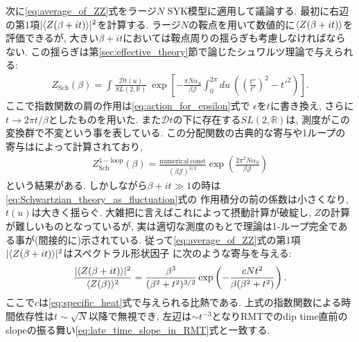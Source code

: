 次に\eqref{eq:average_of_ZZ}式をラージ$N$ SYK模型に適用して議論する. 
最初に右辺の第1項$|\langle Z(\beta + it) \rangle|^2$を計算する. 
ラージ$N$の鞍点を用いて数値的に$\langle Z(\beta + it) \rangle$を評価できるが, 
大きい$\beta + it$においては鞍点周りの揺らぎも考慮しなければならない. 
この揺らぎは第\ref{sec:effective_theory}節で論じたシュワルツ理論で与えられる:
\begin{align}
	Z_{\mathrm{Sch}}(\beta)
	= \int \frac{\mathcal{D}t(u)}{SL(2, \mathbb{R})}\ 
		\exp\left[
			-\frac{\pi N\alpha_S}{\beta\mathcal{J}}\int_0^{2\pi}du\ 
			\left(\left(\frac{t''}{t'}\right)^2 - t'^2\right)		
		\right].
	\label{eq:Schwartzian_theory_as_fluctuation}
\end{align}
ここで指数関数の肩の作用は\eqref{eq:action_for_epsilon}式で
$\epsilon$を$t$に書き換え, さらに$t\to 2\pi t/\beta$としたものを用いた. 
また$\mathcal{D}t$の下に存在する$SL(2,\mathbb{R})$は, 測度がこの変換群で不変という事を表している. 
この分配関数の古典的な寄与や1ループの寄与は\cite{maldacena}によって計算されており, 
\begin{align}
	Z_{\mathrm{Sch}}^{\mathrm{1-loop}}(\beta)
	= \frac{\mathrm{numerical\ const}}{(\beta \mathcal{J})^{3/2}}
		\exp\left(\frac{2\pi^2N\alpha_S}{\beta\mathcal{J}}\right)
	\label{eq:one_loop_Schwartzian}
\end{align}
という結果がある. 
しかしながら$\beta + it\gg 1$の時は\eqref{eq:Schwartzian_theory_as_fluctuation}式の
作用積分の前の係数は小さくなり, $t(u)$は大きく揺らぐ. 
大雑把に言えばこれによって摂動計算が破綻し, $Z$の計算が難しいものとなっているが, 
実は適切な測度のもとで理論は1-ループ完全である事が(間接的に)示されている\cite{polchinski_chaos}. 
従って\eqref{eq:average_of_ZZ}式の第1項$|\langle Z(\beta + it) \rangle|^2$はスペクトラル形状因子
に次のような寄与を与える:
\begin{align}
	\frac{|\langle Z(\beta + it) \rangle|^2}{\langle Z(\beta) \rangle^2}
	= \frac{\beta^3}{(\beta^2 + t^2)^{3/2}}\exp\left(
		-\frac{cNt^2}{\beta(\beta^2 + t^2)}	
	\right).
	\label{eq:slope_in_SYK}
\end{align}
ここで$c$は\eqref{eq:specific_heat}式で与えられる比熱である. 
上式の指数関数による時間依存性は$t\sim \sqrt{N}$以降で無視でき, 
左辺は$\sim t^{-3}$となりRMTでのdip time直前の
slopeの振る舞い\eqref{eq:late_time_slope_in_RMT}式と一致する. 

